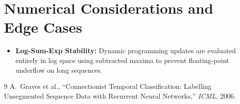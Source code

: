 \documentclass[11pt]{article}
\begin{document}
\section{Numerical Considerations and Edge Cases}
\label{sec:numerical}

\begin{itemize}
    \item \textbf{Log-Sum-Exp Stability:} Dynamic programming updates are evaluated entirely in log space using subtracted maxima to prevent floating-point underflow on long sequences.
\end{itemize}

\begin{thebibliography}{9}
 A.~Graves et al., ``Connectionist Temporal Classification: Labelling Unsegmented Sequence Data with Recurrent Neural Networks,'' \emph{ICML}, 2006.
\end{thebibliography}
\end{document}

